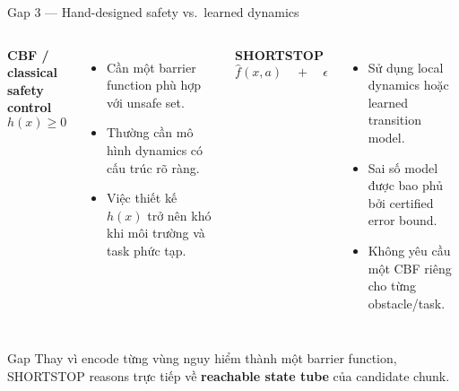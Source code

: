 \documentclass[aspectratio=169]{beamer}
\begin{document}
\begin{frame}[t,shrink=8]{Gap 3 --- Hand-designed safety vs.\ learned dynamics}
\begin{columns}[T]

\textbf{CBF / classical safety control}
\[
h(x)\geq 0
\]
\begin{itemize}
    \item Cần một barrier function phù hợp với unsafe set.
    \item Thường cần mô hình dynamics có cấu trúc rõ ràng.
    \item Việc thiết kế $h(x)$ trở nên khó khi môi trường và task phức tạp.
\end{itemize}

\textbf{SHORTSTOP}
\[
\hat f(x,a)
\quad+\quad
\epsilon
\]
\begin{itemize}
    \item Sử dụng local dynamics hoặc learned transition model.
    \item Sai số model được bao phủ bởi certified error bound.
    \item Không yêu cầu một CBF riêng cho từng obstacle/task.
\end{itemize}

\end{columns}
\vspace{6pt}

\begin{alertblock}{Gap}
Thay vì encode từng vùng nguy hiểm thành một barrier function,
SHORTSTOP reasons trực tiếp về \textbf{reachable state tube} của candidate chunk.
\end{alertblock}
\end{frame}

\end{document}
